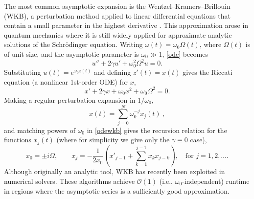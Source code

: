 \documentclass[10pt]{article}
\newcommand{\be}{\begin{equation}}
\newcommand{\ee}{\end{equation}}
\newcommand{\bigO}{{\mathcal O}}
\newcommand{\om}{\omega}
\begin{document}


The most common asymptotic expansion
is the Wentzel--Kramers--Brillouin (WKB), a
perturbation method applied to linear differential equations that contain a
small parameter
in the highest derivative
\cite{benderorszag,logan}.
This approximation arose in quantum mechanics where it is still widely
applied for approximate analytic solutions of the Schr\"{o}dinger equation.
Writing $\om(t) = \om_0\Omega(t)$,
where $\Omega(t)$ is of unit size, and the asymptotic parameter is
$\om_0 \gg 1$,    %
\cref{ode} becomes
\be\label{odewkb}
u'' + 2\gamma u' + \om_0^2 \Omega^2 u = 0.
\ee
Substituting $u(t) = e^{\om_0 z(t)}$ and defining $z'(t) = x(t)$
gives the Riccati equation (a nonlinear 1st-order ODE) for $x$, 
\be\label{riccwkb}
x' + 2\gamma x + \om_0 x^2 + \om_0 \Omega^2 = 0.
\ee
Making a regular perturbation expansion in $1/\om_0$,
\be\label{wkbexpansion}
x(t) = \sum_{j=0}^{N} \om_0^{-j} x_j(t)~,
\ee
and matching powers of $\om_0$ in \cref{odewkb} gives the recursion relation
for the functions $x_j(t)$
(where for simplicity we give only the $\gamma \equiv 0$ case),
\begin{equation}\label{wkbrecur}
  x_0 = \pm i\Omega, \qquad x_j = -\frac{1}{2x_0}\left( x'_{j-1} + \sum_{k = 1}^{j-1}x_k x_{j-k} \right), \quad \text{for } j = 1, 2, \ldots.
\end{equation}
Although originally an analytic tool,
WKB has recently been exploited in numerical solvers.
These algorithms achieve
$\bigO(1)$ (i.e., $\om_0$-independent) runtime in regions where the asymptotic
series is a sufficiently good approximation.
\end{document}
